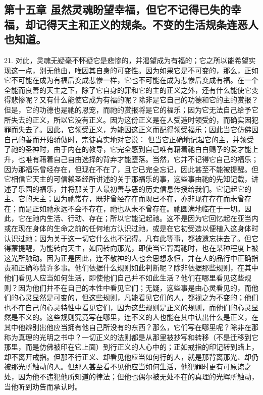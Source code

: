 
\subsection{第十五章 虽然灵魂盼望幸福，但它不记得已失的幸福，却记得天主和正义的规条。不变的生活规条连恶人也知道。}

21. 对此，灵魂无疑毫不怀疑它是悲惨的，并渴望成为有福的；它之所以能希望实现这一点，别无他由，唯因其自身的可变性。因为如果它是不可变的，那么，正如它不可能在成为有福后变成悲惨一样，它也不可能在成为悲惨后变成有福。在一个全能而良善的天主之下，除了它自身的罪和它的主的正义之外，还有什么能使它变得悲惨呢？又有什么能使它成为有福的呢？除非是它自己的功德和它的主的赏报？但是，它的功德也是祂的恩宠，而祂的赏报将是它的福乐；因为它无法自己给予它所失去的正义，所以它没有正义。因为这份正义是在人受造时领受的，而确实因犯罪而失去了。因此，它领受正义，为能因这正义而配得领受福乐；因此当它仿佛因自己的善而开始骄傲时，宗徒真实地对它说： 但当它正确地记起它的主，并领受了祂的圣神时，由于内在的教导，它完全感到自己唯有藉着祂白白赐予的爱才能上升，也唯有藉着自己自由选择的背弃才能堕落。当然，它并不记得它自己的福乐；因为那福乐曾经存在，但现在不在了，且它已完全忘记，因此甚至不能被提醒。但它相信它天主的可信赖圣经所讲述的关于那福乐的事，这些事由祂的先知记载，讲述了乐园的福乐，并将那关于人最初善与恶的历史信息传授给我们。它记起它的主、它的天主；因为祂常存，既非曾经存在而现已不在，亦非现在存在而未曾存在；而是正如祂永远不会不存在，祂也从未不曾存在。祂圆满地临在于一切。因此，它在祂内生活、行动、存在；所以它能记起祂。这不是因为它回忆起在亚当内或在现在身体的生命之前的任何地方认识过祂，或是在它初受造以便植入这身体时认识过祂；因为关于这一切它什么也不记得。凡有此等事，都被遗忘抹去了。但它得蒙提醒，为能转向天主，如同转向那光，即使当它背离祂时，也在某种程度上被这光所触动。因为正是因此，连不敬神的人也会思想永恒，并在人的品行中正确指责和正确称赞许多事。他们依据什么规则如此判断呢？除非依据那些规则，在其中他们看见人应当如何生活，即使他们自己并不如此生活？他们在哪里看见这些规则？因为他们并不在自己的本性中看见它们；无疑，这些事是由心灵看见的，而他们的心灵显然是可变的，但这些规则，凡能看见它们的人，都视之为不变的；他们也不在自己的心灵特性中看见它们，因为这些规则是正义的规则，而他们的心灵显然是不义的。这些规则究竟写在哪里，连不义的人也能在其中认出什么是正义，在其中他辨别出他应当拥有他自己所没有的东西？那么，它们写在哪里呢？除非在那称为真理的光明之书中？一切正义的法则都是从那里被抄写和转移（不是迁移到它那里，而是仿佛被印在它上面）到行正义的人心中的；正如戒指的印记转到蜡上，却不离开戒指。但那不行正义、却看见他应当如何行的人，就是那背离那光、却仍被那光所触动的人。但那人甚至看不见他应当如何生活，他犯罪时更有可原谅之处，因为他不违犯他所知道的律法；但他也偶尔被无处不在的真理的光辉所触动，当他听到劝告而承认时。\par

